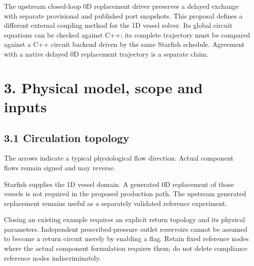 \documentclass[11pt,a4paper]{article}
\begin{document}
The upstream closed-loop 0D replacement driver preserves a delayed exchange with separate provisional and published port snapshots. This proposal defines a different external coupling method for the 1D vessel solver. Its global circuit equations can be checked against C++; its complete trajectory must be compared against a C++ circuit backend driven by the same Starfish schedule. Agreement with a native delayed 0D replacement trajectory is a separate claim.

\section{3. Physical model, scope and inputs}
\subsection{3.1 Circulation topology}

\begin{center}
\end{center}
The arrows indicate a typical physiological flow direction. Actual component flows remain signed and may reverse.

Starfish supplies the 1D vessel domain. A generated 0D replacement of those vessels is not required in the proposed production path. The upstream generated replacement remains useful as a separately validated reference experiment.

Closing an existing example requires an explicit return topology and its physical parameters. Independent prescribed-pressure outlet reservoirs cannot be assumed to become a return circuit merely by enabling a flag. Retain fixed reference nodes where the actual component formulation requires them; do not delete compliance reference nodes indiscriminately.
\end{document}
